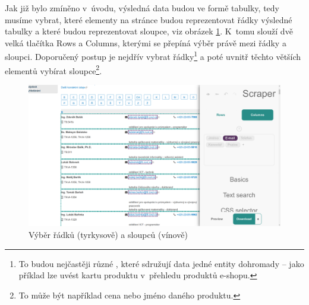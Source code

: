 \documentclass[thesis=B,czech]{FITthesis}[2012/06/26]
\begin{document}
Jak již bylo zmíněno v~úvodu, výsledná data budou ve formě tabulky, tedy musíme vybrat, které elementy na stránce budou reprezentovat řádky výsledné tabulky a které budou reprezentovat sloupce, viz obrázek \ref{fig:scraper_rows_cols}. K~tomu slouží dvě velká tlačítka \textsf{Rows} a \textsf{Columns}, kterými se přepíná výběr právě mezi řádky a sloupci. Doporučený postup je nejdřív vybrat řádky\footnote{To budou nejčastěji různé , které sdružují data jedné entity dohromady -- jako příklad lze uvést kartu produktu v~přehledu produktů e-shopu.} a poté uvnitř těchto větších elementů vybírat sloupce\footnote{To může být například cena nebo jméno daného produktu.}.
\begin{figure}
	\includegraphics[width=\linewidth]{images/Scraper_rows_cols.png}
	\caption{Výběr řádků (tyrkysově) a sloupců (vínově)}
	\label{fig:scraper_rows_cols}
\end{figure}
\end{document}
